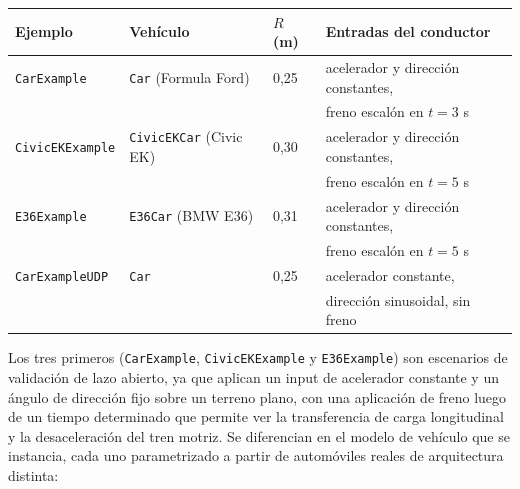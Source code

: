 \begin{center}
\begin{tabular}{llll}
\hline
\textbf{Ejemplo} & \textbf{Vehículo} & \textbf{$R$ (m)} & \textbf{Entradas del conductor} \\
\hline
\verb|CarExample|    & \verb|Car| (Formula Ford)   & 0{,}25 & acelerador y dirección constantes,\\ & & & freno escalón en $t=3$ s \\
\verb|CivicEKExample| & \verb|CivicEKCar| (Civic EK) & 0{,}30 & acelerador y dirección constantes,\\ & & & freno escalón en $t=5$ s \\
\verb|E36Example|     & \verb|E36Car| (BMW E36)      & 0{,}31 & acelerador y dirección constantes,\\& & & freno escalón en $t=5$ s \\
\verb|CarExampleUDP|  & \verb|Car|                  & 0{,}25 & acelerador constante,\\& & & dirección sinusoidal, sin freno \\
\hline
\end{tabular}
\end{center}

Los tres primeros (\verb|CarExample|, \verb|CivicEKExample| y \verb|E36Example|) son escenarios de validación de lazo abierto, ya que aplican un input de acelerador constante y un ángulo de dirección fijo sobre un terreno plano, con una aplicación de freno luego de un tiempo determinado que permite ver la transferencia de carga longitudinal y la desaceleración del tren motriz. Se diferencian en el modelo de vehículo que se instancia, cada uno parametrizado a partir de automóviles reales de arquitectura distinta:

